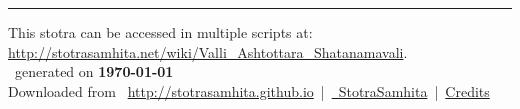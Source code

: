 \documentclass[oneside,12pt]{book}
\begin{document}
\setmainfont[Script=Devanagari,Mapping=tex-text]{Sanskrit 2003}
\fontsize {16}{19.25}\selectfont
\begin{center}

\end{center}
\vfill
\centering
\rule{0.8\textwidth}{0.6pt}

\footnotesize
{}\sffamily
This stotra can be accessed in multiple scripts at:\\
\url{http://stotrasamhita.net/wiki/Valli_Ashtottara_Shatanamavali}.\\[1ex]
\faFilePdfO~generated on \textbf{\today}\\[1ex]
Downloaded from \faGlobe{}~\url{http://stotrasamhita.github.io}~|~\href{https://github.com/StotraSamhita}{\faGithubSquare{}~StotraSamhita}~|~\href{https://stotrasamhita.github.io/about/}{Credits}
\end{document}
